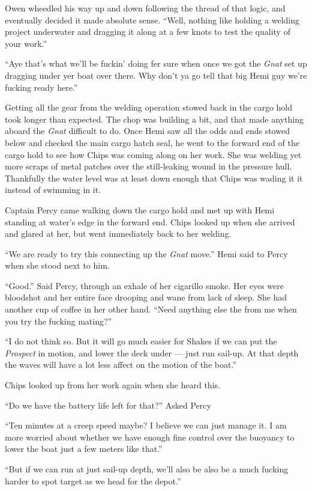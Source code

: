 \documentclass[
]{scrbook}
\begin{document}
Owen wheedled his way up and down following the thread of that logic,
and eventually decided it made absolute sense. ``Well, nothing like
holding a welding project underwater and dragging it along at a few
knots to test the quality of your work.''

``Aye that's what we'll be fuckin' doing fer sure when once we got the
\emph{Gnat} set up dragging under yer boat over there. Why don't ya go
tell that big Hemi guy we're fucking ready here.''

Getting all the gear from the welding operation stowed back in the cargo
hold took longer than expected. The chop was building a bit, and that
made anything aboard the \emph{Gnat} difficult to do. Once Hemi saw all
the odds and ends stowed below and checked the main cargo hatch seal, he
went to the forward end of the cargo hold to see how Chips was coming
along on her work. She was welding yet more scraps of metal patches over
the still-leaking wound in the pressure hull. Thankfully the water level
was at least down enough that Chips was wading it it instead of swimming
in it.

Captain Percy came walking down the cargo hold and met up with Hemi
standing at water's edge in the forward end. Chips looked up when she
arrived and glared at her, but went immediately back to her welding.

``We are ready to try this connecting up the \emph{Gnat} move.'' Hemi
said to Percy when she stood next to him.

``Good.'' Said Percy, through an exhale of her cigarillo smoke. Her eyes
were bloodshot and her entire face drooping and wane from lack of sleep.
She had another cup of coffee in her other hand. ``Need anything else
the from me when you try the fucking mating?''

``I do not think so. But it will go much easier for Shakes if we can put
the \emph{Prospect} in motion, and lower the deck under --- just run
sail-up. At that depth the waves will have a lot less affect on the
motion of the boat.''

Chips looked up from her work again when she heard this.

``Do we have the battery life left for that?'' Asked Percy

``Ten minutes at a creep speed maybe? I believe we can just manage it. I
am more worried about whether we have enough fine control over the
buoyancy to lower the boat just a few meters like that.''

``But if we can run at just sail-up depth, we'll also be also be a much
fucking harder to spot target as we head for the depot.''
\end{document}
